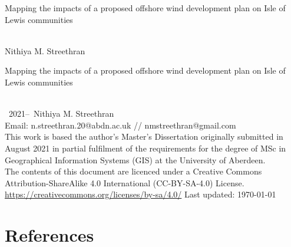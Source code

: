\documentclass[twoside,12pt,openany]{book}
\def\theauthor{Nithiya M. Streethran}
\def\thetitle{%
  Mapping the impacts of a proposed offshore wind development plan on
  Isle of Lewis communities%
}
\begin{document}

\frontmatter

\begin{titlepage}
  \hspace{0pt}\vfill %
  \centering %
  \Large\thetitle
  \\[4cm]
  \large\theauthor %
  \vfill\hspace{0pt} %
\end{titlepage}

{%
  \setlength{\parindent}{0pt}
  \hspace{0pt}\vfill
  \thetitle
  \\[.5cm]
  \textcopyright~2021--\the\year{}~\theauthor
  \\[.5cm]
  Email: n.streethran.20@abdn.ac.uk // nmstreethran@gmail.com
  \\[.5cm]
  This work is based the author's Master's Dissertation originally
  submitted in August 2021 in partial fulfilment of the requirements for the
  degree of MSc in Geographical Information Systems (GIS) at the University of
  Aberdeen.
  \\[.5cm]
  The contents of this document are licenced under a Creative Commons
  Attribution-ShareAlike 4.0 International (CC-BY-SA-4.0) License. \\
  \url{https://creativecommons.org/licenses/by-sa/4.0/}
  \vfill
  Last updated: \today
  \vfill\hspace{0pt}
}

\doublespacing



\tableofcontents
\listoffigures
\listoftables
\printglossaries



\themainmatter








{%
  \backmatter%
  \chapter{References}%
  \printbibliography[category=cited,heading=none]%
}

\nocite{*}
\theappendix


\end{document}
